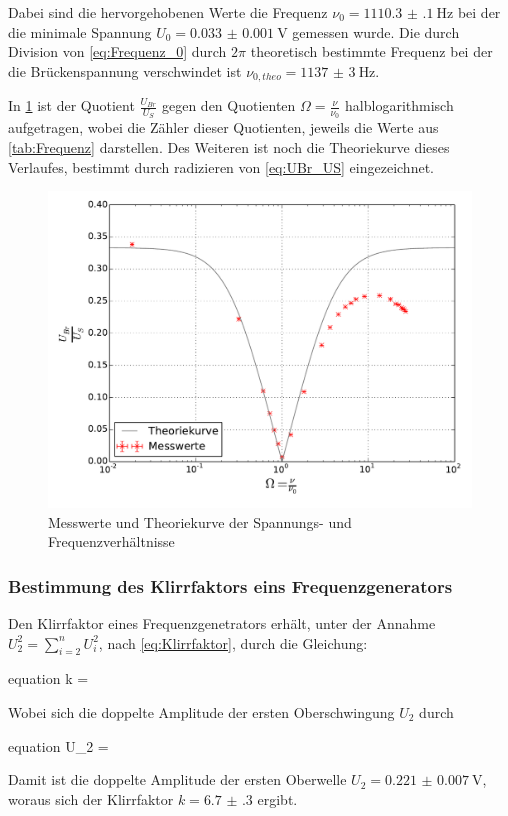 	Dabei sind die hervorgehobenen Werte die Frequenz $\nu_{0} = \SI{1110.3(1)}{\hertz}$ bei der die minimale Spannung
	$U_{0} = \SI{0.033(1)}{\volt}$ gemessen wurde. Die durch Division von \cref{eq:Frequenz_0} durch $2\pi$ theoretisch 
	bestimmte Frequenz bei der die 
	Brückenspannung verschwindet ist $\nu_{0,theo} = \SI{1137(3)}{\hertz}$.     
	
	In \cref{fig:WienRobinson} ist der Quotient $\frac{U_{Br}}{U_{S}}$ gegen 
	den Quotienten  $\Omega = \frac{\nu}{\nu_{0}}$ halblogarithmisch aufgetragen, wobei die Zähler dieser Quotienten,
	jeweils die Werte aus \cref{tab:Frequenz} darstellen. Des Weiteren ist noch die Theoriekurve dieses Verlaufes, bestimmt durch radizieren von \cref{eq:UBr_US} eingezeichnet.  
		
	\begin{figure}[!h]
		\centering
		\includegraphics[scale=0.75]{Grafiken/WienRobinson.pdf}
		\caption{Messwerte und Theoriekurve der Spannungs- und Frequenzverhältnisse}
		\label{fig:WienRobinson}
	\end{figure}

\subsubsection{Bestimmung des Klirrfaktors eins Frequenzgenerators}
\label{sec:Auswertung_Klirrfaktor} 
	
	Den Klirrfaktor eines Frequenzgenetrators erhält, unter der Annahme $\displaystyle U_{2}^{2} = \sum_{i=2}^{n} U_{i}^{2}$,
	nach \cref{eq:Klirrfaktor}, durch die Gleichung:
	\begin{empheq}{equation}
		k = 
		\label{eq:Klirrfaktor2}
	\end{empheq}     
	
	Wobei sich die doppelte Amplitude der ersten Oberschwingung $U_{2}$ durch
	\begin{empheq}{equation}
		U_{2} = \footnotemark
		\label{eq:Oberwelle}
	\end{empheq}
	
	Damit ist die doppelte Amplitude der ersten Oberwelle $U_{2} = \SI{0.221(7)}{\volt}$,
	woraus sich der  Klirrfaktor  $k = \num{6.7(3)}$ ergibt.
	